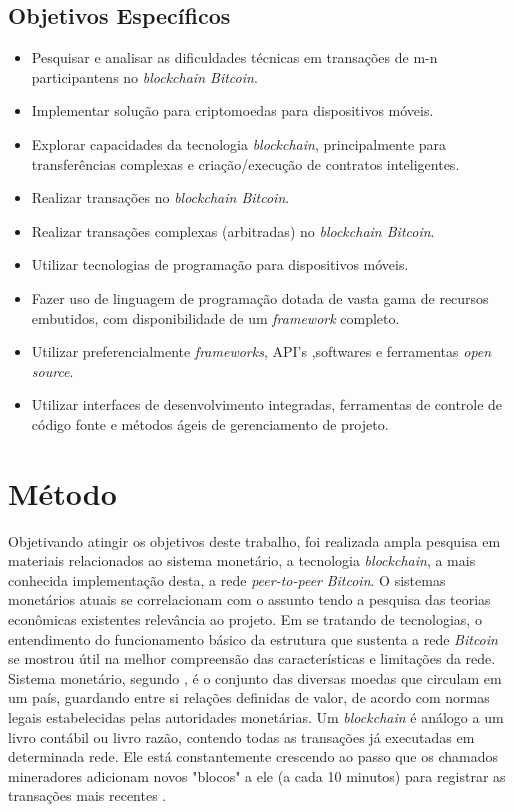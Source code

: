 \documentclass[
	article,			%
	11pt,				%
	oneside,			%
	a4paper,			%
	chapter=TITLE,		%
	section=TITLE,		%
	subsection=TITLE,	%
	subsubsection=TITLE, %
	english,			%
	brazil,				%
	sumario=tradicional
	]{ifrs-artigo-abntex2}
\begin{document}
\subsection{Objetivos Específicos}
\begin{itemize}
    \item Pesquisar e analisar as dificuldades técnicas em transações de m-n participantens no \textit{blockchain Bitcoin}.
	\item Implementar solução para criptomoedas para dispositivos móveis.
	\item Explorar capacidades da tecnologia \textit{blockchain}, principalmente para transferências complexas e criação/execução de contratos inteligentes.
	\item Realizar transações no \textit{blockchain Bitcoin}.
	\item Realizar transações complexas (arbitradas) no \textit{blockchain Bitcoin}.
	\item Utilizar tecnologias de programação para dispositivos móveis.
	\item Fazer uso de linguagem de programação dotada de vasta gama de recursos embutidos, com disponibilidade de um \textit{framework} completo.
	\item Utilizar preferencialmente \textit{frameworks}, API's ,softwares e ferramentas \textit{open source}.
	\item Utilizar interfaces de desenvolvimento integradas, ferramentas de controle de código fonte e métodos ágeis de gerenciamento de projeto. 
\end{itemize}

\section{Método}
Objetivando atingir os objetivos deste trabalho, foi realizada ampla pesquisa em materiais relacionados ao sistema monetário, a tecnologia \textit{blockchain}, a mais conhecida implementação desta, a rede \textit{peer-to-peer} \textit{Bitcoin}.
O sistemas monetários atuais se correlacionam com o assunto tendo a pesquisa das teorias econômicas existentes relevância ao projeto. Em se tratando de tecnologias, o entendimento do funcionamento básico da estrutura que sustenta a rede \textit{Bitcoin} se mostrou útil na melhor compreensão das características e limitações da rede.
Sistema monetário, segundo , é o conjunto das diversas moedas que circulam em um país, guardando entre si relações definidas de valor, de acordo com normas legais estabelecidas pelas autoridades monetárias.
Um \textit{blockchain} é análogo a um livro contábil ou livro razão, contendo todas as transações já executadas em determinada rede. Ele está constantemente crescendo ao passo que os chamados mineradores adicionam novos "blocos" a ele (a cada 10 minutos) para registrar as transações mais recentes \cite{swan2015blockchain}.
\end{document}
